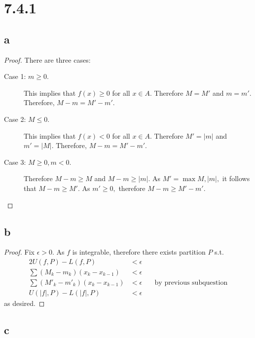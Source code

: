 \documentclass[10pt]{article}
\begin{document}
\section*{7.4.1}

\subsection*{a}

\begin{proof}
    There are three cases:
    \begin{description}
        \item[Case 1: $m \ge 0.$] This implies that $f(x)\ge 0$ for all $x\in A.$ Therefore $M=M'$ and $m=m'.$ Therefore, $M-m = M'-m'.$
        \item[Case 2: $M \le 0.$] This implies that $f(x)< 0$ for all $x\in A.$ Therefore $M' = |m|$ and $m' = |M|.$ Therefore, $M-m = M'-m'.$
        \item[Case 3: $M\ge 0, m<0.$] Therefore $M-m \ge M$ and $M-m\ge |m|.$ As $M' = \max{M, |m|},$ it follows that $M-m \ge M'.$ As $m' \ge 0,$ therefore $M-m\ge M'-m'.$ 
    \end{description}
\end{proof}
\subsection*{b}

\begin{proof}
    Fix $\epsilon>0.$ As $f$ is integrable, therefore there exists partition $P$ s.t.
    \begin{alignat*}{2}
        U(f,P)-L(f,P) &< \epsilon\\
        \sum (M_k- m_k)(x_k-x_{k-1}) &< \epsilon\\
        \sum (M'_k- m'_k)(x_k-x_{k-1}) &< \epsilon &&\text{by previous subquestion}\\
        U(|f|,P)-L(|f|,P) &< \epsilon\
    \end{alignat*}
    as desired.
\end{proof}


\subsection*{c}
\end{document}

